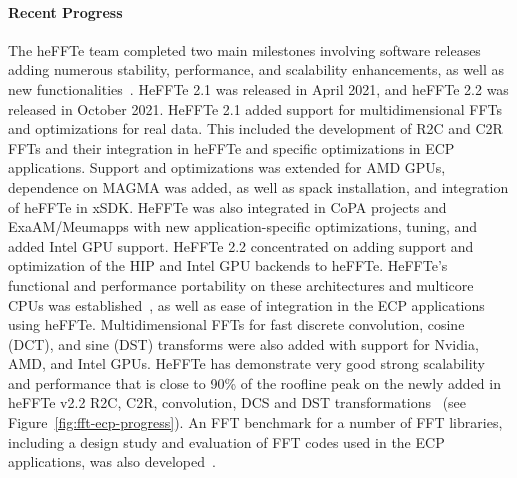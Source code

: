 \paragraph{Recent Progress}
The heFFTe team completed two main milestones involving software releases adding 
numerous stability, performance, and scalability enhancements, as well as new 
functionalities~\cite{heffte-pact21}. 
HeFFTe 2.1 was released in April 2021, and heFFTe 2.2 was released in October 
2021. HeFFTe 2.1 added support for multidimensional FFTs and optimizations for real data.
This included the development of R2C and C2R FFTs and their integration in heFFTe and 
specific optimizations in ECP applications. Support and optimizations was extended for AMD 
GPUs, dependence on MAGMA was added, as well as spack installation, and integration of heFFTe in xSDK.
HeFFTe was also integrated in CoPA projects and ExaAM/Meumapps with new application-specific 
optimizations, tuning, and added Intel GPU support. 
HeFFTe 2.2 concentrated on adding support and optimization of the HIP and Intel GPU backends to 
heFFTe. HeFFTe's functional and performance portability on these architectures and
multicore CPUs was established~\cite{hpec21}, as well as ease of integration in the ECP applications 
using heFFTe. 
Multidimensional FFTs for 
fast discrete convolution, cosine (DCT), and sine (DST) transforms were also added with support 
for Nvidia, AMD, 
and Intel GPUs. HeFFTe has demonstrate very good strong scalability and performance that is 
close to 90\% of the roofline peak on the newly added in heFFTe v2.2 R2C, C2R, convolution,
DCS and DST transformations~\cite{heffte-pact21,heffte-iccs20} (see Figure~\ref{fig:fft-ecp-progress}). 
An FFT benchmark for a number of FFT libraries, including a design study and evaluation of FFT 
codes used in the ECP applications, was also developed~\cite{fftbenchmark}.

